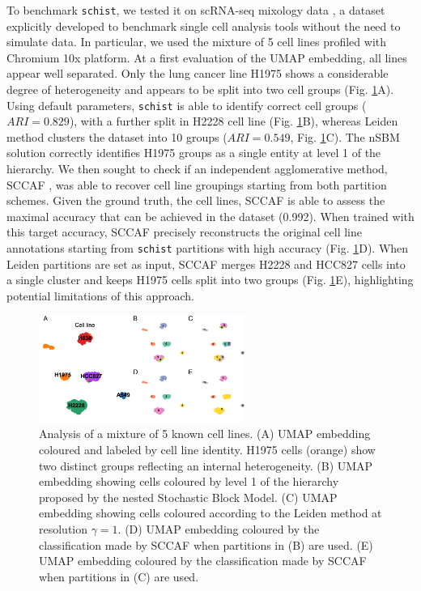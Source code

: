 \documentclass[10pt]{article}
\begin{document}
To benchmark \texttt{schist}, we tested it on scRNA-seq mixology data \cite{Tian_2019}, a dataset explicitly developed to benchmark single cell analysis tools without the need to simulate data. In particular, we used the mixture of 5 cell lines profiled with Chromium 10x platform. At a first evaluation of the UMAP embedding, all lines appear well separated. Only the lung cancer line H1975 shows a considerable degree of heterogeneity and appears to be split into two cell groups (Fig. \ref{FigureTian}A). Using default parameters, \texttt{schist} is able to identify correct cell groups ($ARI=0.829$), with a further split in H2228 cell line (Fig. \ref{FigureTian}B), whereas Leiden method clusters the dataset into 10 groups ($ARI=0.549$, Fig. \ref{FigureTian}C). The nSBM solution correctly identifies H1975 groups as a single entity at level 1 of the hierarchy. We then sought to check if an independent agglomerative method, SCCAF \cite{miao_2020}, was able to recover cell line groupings starting from both partition schemes. Given the ground truth, the cell lines, SCCAF is able to assess the maximal accuracy that can be achieved in the dataset (0.992). When trained with this target accuracy, SCCAF precisely reconstructs the original cell line annotations starting from \texttt{schist} partitions with high accuracy (Fig. \ref{FigureTian}D). When Leiden partitions are set as input, SCCAF merges H2228 and HCC827 cells into a single cluster and keeps H1975 cells split into two groups (Fig. \ref{FigureTian}E), highlighting potential limitations of this approach. %

\begin{figure}[H]
\centering
\includegraphics[keepaspectratio,width=0.6\textwidth,height=\textheight]{FigureTian.pdf}
\caption[]{Analysis of a mixture of 5 known cell lines. (A) UMAP embedding coloured and labeled by cell line identity. H1975 cells (orange) show two distinct groups reflecting an internal heterogeneity. (B) UMAP embedding showing cells coloured by level 1 of the hierarchy proposed by the nested Stochastic Block Model. (C) UMAP embedding showing cells coloured according to the Leiden method at resolution $\gamma = 1$. (D) UMAP embedding coloured by the classification made by SCCAF when partitions in (B) are used. (E) UMAP embedding coloured by the classification made by SCCAF when partitions in (C) are used.}\label{FigureTian}
\end{figure}
\end{document}
